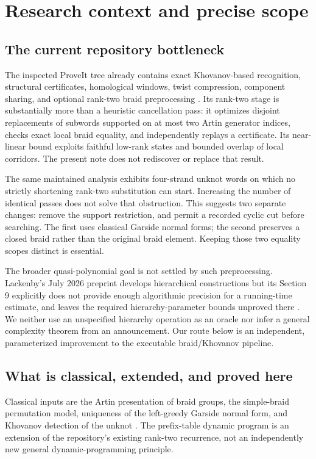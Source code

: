\documentclass[11pt,a4paper]{article}
\theoremstyle{definition}\newtheorem{definition}[theorem]{Definition}
\theoremstyle{remark}\newtheorem{remark}[theorem]{Remark}
\begin{document}
\setcounter{tocdepth}{1}
\tableofcontents
\newpage

\section{Research context and precise scope}

\subsection{The current repository bottleneck}
The inspected ProveIt tree already contains exact Khovanov-based recognition,
structural certificates, homological windows, twist compression, component
sharing, and optional rank-two braid preprocessing
\cite{ProveItReadme,ProveItRankTwo}. Its rank-two stage is substantially more
than a heuristic cancellation pass: it optimizes disjoint replacements of
subwords supported on at most two Artin generator indices, checks exact local
braid equality, and independently replays a certificate. Its near-linear
bound exploits faithful low-rank states and bounded overlap of local
corridors. The present note does not rediscover or replace that result.

The same maintained analysis exhibits four-strand unknot words on which no
strictly shortening rank-two substitution can start. Increasing the number
of identical passes does not solve that obstruction. This suggests two
separate changes: remove the support restriction, and permit a recorded
cyclic cut before searching. The first uses classical Garside normal forms;
the second preserves a closed braid rather than the original braid element.
Keeping those two equality scopes distinct is essential.

The broader quasi-polynomial goal is not settled by such preprocessing.
Lackenby's July 2026 preprint develops hierarchical constructions but its
Section 9 explicitly does not provide enough algorithmic precision for a
running-time estimate, and leaves the required hierarchy-parameter bounds
unproved there \cite{Lackenby2026}. We neither use an unspecified hierarchy
operation as an oracle nor infer a general complexity theorem from an
announcement. Our route below is an independent, parameterized improvement
to the executable braid/Khovanov pipeline.

\subsection{What is classical, extended, and proved here}
Classical inputs are the Artin presentation of braid groups, the simple-braid
permutation model, uniqueness of the left-greedy Garside normal form, and
Khovanov detection of the unknot \cite{Dehornoy2007,KM2011}. The
prefix-table dynamic program is an extension of the repository's existing
rank-two recurrence, not an independently new general dynamic-programming
principle.
\end{document}
